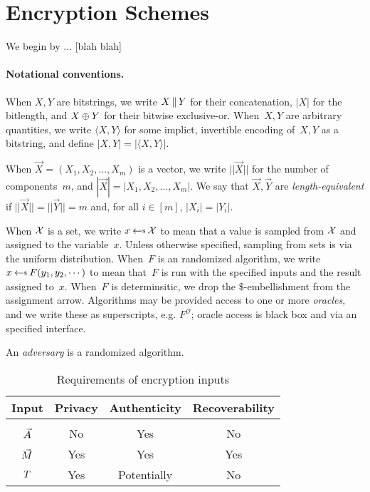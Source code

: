 \newcommand{\dimension}[1]{|| #1 ||}
\section{Encryption Schemes}
\label{sec:prelims}
\label{sec:encryption}
We begin by ... [blah blah]

\paragraph{Notational conventions. }When $X,Y$ are bitstrings, we write $X \,\|\, Y$ for their concatenation, $|X|$ for the bitlength, and $X\oplus Y$ for their bitwise exclusive-or.  When~$X,Y$ are arbitrary quantities, we write $\langle X,Y \rangle$ for some implict, invertible encoding of~$X,Y$ as a bitstring, and define $|X,Y|=|\langle X,Y\rangle|$.

When $\vec{X}=(X_1,X_2,\ldots,X_m)$ is a  vector, we write $\dimension{\vec{X}}$ for the number of components~$m$, and $|\vec{X}|=|X_1,X_2,\ldots,X_m|$.  We say that $\vec{X},\vec{Y}$ are \emph{length-equivalent} if $\dimension{\vec{X}}=\dimension{\vec{Y}}=m$ and, for all $i\in[m]$, $|X_i|=|Y_i|$.

When $\mathcal{X}$ is a set, we write $x \getsr \calX$ to mean that a value is sampled from $\mathcal{X}$ and assigned to the variable~$x$.  Unless otherwise specified, sampling from sets is via the uniform distribution.  
When~$F$ is an randomized algorithm, we write $x \getsr F(y_1,y_2,\cdots)$ to mean that~$F$ is run with the specified inputs and the result assigned to~$x$.  When~$F$ is determinsitic, we drop the $\$$-embellishment from the assignment arrow.  Algorithms may be provided access to one or more \emph{oracles}, and we write these as superscripts, e.g. $F^{\mathcal{O}}$; oracle access is black box and via an specified interface.  

An \emph{adversary} is a randomized algorithm.


\begin{table}[tp]
\centering
\begin{tabular}{c||c|c|c}
Input  & Privacy & Authenticity & Recoverability \\
\hline
&&&\\[-1.5ex]
$\vec{A}$      & No    & Yes        &  No \\
$\vec{M}$   & Yes   & Yes         & Yes \\ 
$T$    & Yes    & Potentially  &  No \\ [0.5ex]
\hline
\end{tabular}
\caption{Requirements of encryption inputs}
\end{table}

